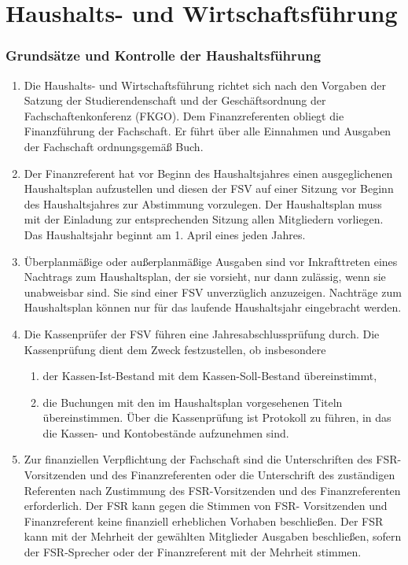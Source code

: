 \documentclass{article}
\providecommand{\tightlist}{\setlength{\itemsep}{0pt}\setlength{\parskip}{0pt}}
\begin{document}
\part{Haushalts- und Wirtschaftsführung}\label{c.-haushalts--und-wirtschaftsfuxfchrung}

\section{Grundsätze und Kontrolle der Haushaltsführung}\label{grundsuxe4tze-und-kontrolle-der-haushaltsfuxfchrung}

\begin{enumerate}[(1)]
	\item Die Haushalts- und Wirtschaftsführung richtet sich nach den Vorgaben der Satzung der Studierendenschaft und der Geschäftsordnung der Fachschaftenkonferenz (FKGO). Dem Finanzreferenten obliegt die Finanzführung der Fachschaft. Er führt über alle Einnahmen und Ausgaben der Fachschaft ordnungsgemäß Buch.
	\item Der Finanzreferent hat vor Beginn des Haushaltsjahres einen ausgeglichenen Haushaltsplan aufzustellen und diesen der FSV auf einer Sitzung vor Beginn des Haushaltsjahres zur Abstimmung vorzulegen. Der Haushaltsplan muss mit der Einladung zur entsprechenden Sitzung allen Mitgliedern vorliegen. Das Haushaltsjahr beginnt am 1. April eines jeden Jahres.
	\item Überplanmäßige oder außerplanmäßige Ausgaben sind vor Inkrafttreten eines Nachtrags zum Haushaltsplan, der sie vorsieht, nur dann zulässig, wenn sie unabweisbar sind. Sie sind einer FSV unverzüglich anzuzeigen. Nachträge zum Haushaltsplan können nur für das laufende Haushaltsjahr eingebracht werden.
	\item Die Kassenprüfer der FSV führen eine Jahresabschlussprüfung durch. Die Kassenprüfung dient dem Zweck festzustellen, ob insbesondere
	\begin{enumerate}[1.]
		\tightlist
		\item der Kassen-Ist-Bestand mit dem Kassen-Soll-Bestand übereinstimmt,
		\item die Buchungen mit den im Haushaltsplan vorgesehenen Titeln übereinstimmen. Über die Kassenprüfung ist Protokoll zu führen, in das die Kassen- und Kontobestände aufzunehmen sind.
	\end{enumerate}
	\item Zur finanziellen Verpflichtung der Fachschaft sind die Unterschriften des FSR-Vorsitzenden und des Finanzreferenten oder die Unterschrift des zuständigen Referenten nach Zustimmung des FSR-Vorsitzenden und des Finanzreferenten erforderlich. Der FSR kann gegen die Stimmen von FSR- Vorsitzenden und Finanzreferent keine finanziell erheblichen Vorhaben beschließen. Der FSR kann mit der Mehrheit der gewählten Mitglieder Ausgaben beschließen, sofern der FSR-Sprecher oder der Finanzreferent mit der Mehrheit stimmen.
\end{enumerate}
\end{document}

